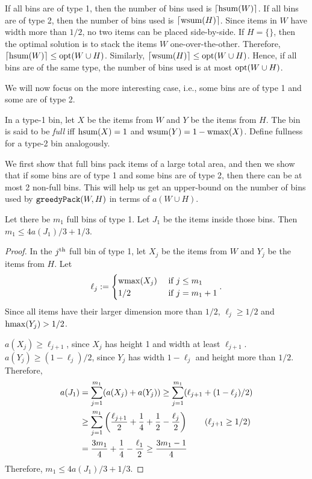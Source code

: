 If all bins are of type 1, then the number of bins used is $\lceil \operatorname{hsum}(W) \rceil$.
If all bins are of type 2, then the number of bins used is $\lceil \operatorname{wsum}(H) \rceil$.
Since items in $W$ have width more than $1/2$, no two items can be placed side-by-side.
If $H = \{\}$, then the optimal solution is to stack the items $W$ one-over-the-other.
Therefore, $\lceil \operatorname{hsum}(W) \rceil \le \operatorname{opt}(W \cup H)$.
Similarly, $\lceil \operatorname{wsum}(H) \rceil \le \operatorname{opt}(W \cup H)$.
Hence, if all bins are of the same type, the number of bins used is at most $\operatorname{opt}(W \cup H)$.

We will now focus on the more interesting case, i.e.,
some bins are of type 1 and some are of type 2.

\begin{definition}
In a type-1 bin, let $X$ be the items from $W$ and $Y$ be the items from $H$.
The bin is said to be \emph{full} iff $\operatorname{hsum}(X) = 1$ and $\operatorname{wsum}(Y) = 1 - \operatorname{wmax}(X)$.
Define fullness for a type-2 bin analogously.
\end{definition}

We first show that full bins pack items of a large total area,
and then we show that if some bins are of type 1 and some bins are of type 2,
then there can be at most 2 non-full bins.
This will help us get an upper-bound on the number of bins used by $\operatorname{\mathtt{greedyPack}}(W, H)$
in terms of $a(W \cup H)$.

\begin{lemma}
\label{thm:area-bound}
Let there be $m_1$ full bins of type 1.
Let $J_1$ be the items inside those bins.
Then $m_1 \le 4a(J_1)/3 + 1/3$.
\end{lemma}
\begin{proof}
In the $j^{\textrm{th}}$ full bin of type 1, let $X_j$ be the items from $W$
and $Y_j$ be the items from $H$. Let
\[ \ell_j := \begin{cases}\operatorname{wmax}(X_j) & \textrm{ if } j \le m_1
\\ 1/2 & \textrm{ if } j = m_1 + 1 \end{cases}. \]
Since all items have their larger dimension more than $1/2$,
$\ell_j \ge 1/2$ and $\operatorname{hmax}(Y_j) > 1/2$.

$a(X_j) \ge \ell_{j+1}$, since $X_j$ has height 1 and width at least $\ell_{j+1}$.
$a(Y_j) \ge (1-\ell_j)/2$, since $Y_j$ has width $1 - \ell_j$ and height more than $1/2$.
Therefore,
\begin{align*}
a(J_1) &= \sum_{j=1}^{m_1} (a(X_j) + a(Y_j))
\ge \sum_{j=1}^{m_1} (\ell_{j+1} + (1-\ell_j)/2)
\\ &\ge \sum_{j=1}^{m_1} \left(\frac{\ell_{j+1}}{2} + \frac{1}{4}
    + \frac{1}{2} - \frac{\ell_j}{2}\right)  \tag{$\ell_{j+1} \ge 1/2$}
\\ &= \frac{3m_1}{4} + \frac{1}{4} - \frac{\ell_1}{2}
\ge \frac{3m_1-1}{4}
\end{align*}
Therefore, $m_1 \le 4a(J_1)/3 + 1/3$.
\end{proof}

